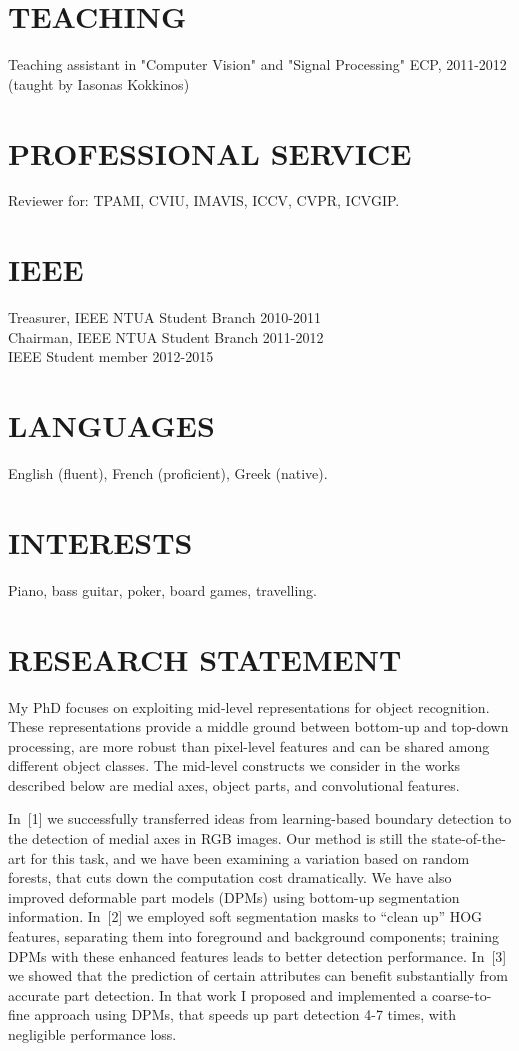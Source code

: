 \documentclass[margin]{res}
\begin{document}
\begin{resume}
\section{TEACHING} Teaching assistant in "Computer Vision" and "Signal Processing" \hfill ECP, 2011-2012 \\(taught by Iasonas Kokkinos)  	
\section{PROFESSIONAL SERVICE} Reviewer for: TPAMI, CVIU, IMAVIS, ICCV, CVPR, ICVGIP. 
\newline

\section{IEEE}
		Treasurer, IEEE NTUA Student Branch \hfill 2010-2011 \\
	    Chairman, IEEE NTUA Student Branch \hfill 2011-2012 \\
	    IEEE Student member	\hfill 2012-2015
 
 \section{LANGUAGES} English (fluent), French (proficient), Greek (native).
 \section{INTERESTS} Piano, bass guitar, poker, board games, travelling.
 
  \section{RESEARCH STATEMENT} My PhD focuses on exploiting mid-level representations for object recognition. These representations provide a middle ground between bottom-up and top-down processing, are more robust than pixel-level features and can be shared among different object classes. The mid-level constructs we consider in the works described below are medial axes, object parts, and convolutional features.
 
In~[1] we successfully transferred ideas from learning-based boundary detection to the detection of medial axes in RGB images. Our method is still the state-of-the-art for this task, and we have been examining a variation based on random forests, that cuts down the computation cost dramatically. We have also improved deformable part models (DPMs) using bottom-up segmentation information. In~[2] we employed soft segmentation masks to ``clean up'' HOG features, separating them into foreground and background components; training DPMs with these enhanced features leads to better detection performance. In~[3] we showed that the prediction of certain attributes can benefit substantially from accurate part detection. In that work I proposed and implemented a coarse-to-fine approach using DPMs, that speeds up part detection 4-7 times, with negligible performance loss.


\end{resume}
\end{document}
